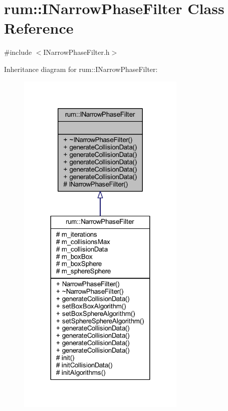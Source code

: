 \hypertarget{classrum_1_1_i_narrow_phase_filter}{}\section{rum\+:\+:I\+Narrow\+Phase\+Filter Class Reference}
\label{classrum_1_1_i_narrow_phase_filter}


{\ttfamily \#include $<$I\+Narrow\+Phase\+Filter.\+h$>$}



Inheritance diagram for rum\+:\+:I\+Narrow\+Phase\+Filter\+:\nopagebreak
\begin{figure}[H]
\begin{center}
\leavevmode
\includegraphics[width=228pt]{classrum_1_1_i_narrow_phase_filter__inherit__graph}
\end{center}
\end{figure}



